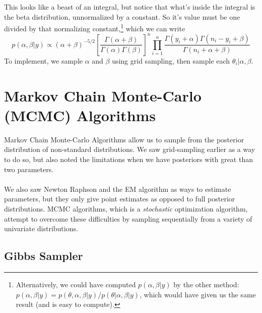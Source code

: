 \documentclass[a4paper,12pt]{scrartcl}
\begin{document}
This looks like a beast of an integral, but notice that what's inside 
the integral is the beta distribution, unnormalized by a constant. So
it's value must be one divided by that normalizing constant,\footnote{
Alternatively, we could have computed $p(\alpha, \beta |y)$
by the other method: $p(\alpha, \beta | y) = 
p(\theta, \alpha, \beta | y)/p(\theta|\alpha, \beta | y)$, which
would have given us the same result (and is easy
to compute).} which we can write
\[ p(\alpha, \beta | y) \propto (\alpha + \beta)^{-5/2}
   \left[\frac{\Gamma(\alpha+\beta)}{\Gamma(\alpha) \Gamma(\beta)}
      \right]^n  \prod^n_{i=1} \frac{ \Gamma(y_i + \alpha) \Gamma(
      n_i - y_i + \beta)}{\Gamma(n_i + \alpha + \beta)} \]
To implement, we sample $\alpha$ and $\beta$ using grid sampling, 
then sample each $\theta_i | \alpha, \beta$.

\newpage
\section{Markov Chain Monte-Carlo (MCMC) Algorithms}

Markov Chain Monte-Carlo Algorithms allow us to sample from the 
posterior distribution of non-standard distributions. We saw 
grid-sampling earlier as a way to do so, but also noted the limitations
when we have posteriors with great than two parameters. 
\\
\\
We also saw Newton Raphson and the EM algorithm as ways to estimate
parameters, but they only give point estimates as opposed to full
posterior distributions.  MCMC algorithms, which is a \emph{stochastic}
optimization algorithm, attempt to overcome these difficulties
by sampling sequentially from a variety of univariate distributions.

\subsection{Gibbs Sampler}
\end{document}
